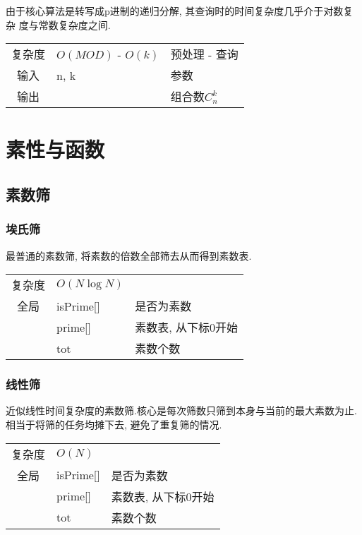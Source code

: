 由于核心算法是转写成p进制的递归分解, 其查询时的时间复杂度几乎介于对数复杂
度与常数复杂度之间.

\begin{longtable}{|c|l|l|}
复杂度 & $O(MOD)$ - $O(k)$ & 预处理 - 查询 \\
输入 & n, k & 参数 \\
输出 &  & 组合数$C^{k}_{n}$ \\
\end{longtable}






\section{素性与函数}


    \subsection{素数筛}\small


        \subsubsection{埃氏筛}\small
最普通的素数筛, 将素数的倍数全部筛去从而得到素数表.

\begin{longtable}{|c|l|l|}
复杂度 & $O(N \log N)$ &  \\
全局 & isPrime[] & 是否为素数 \\
 & prime[] & 素数表, 从下标0开始 \\
 & tot & 素数个数 \\
\end{longtable}



        \subsubsection{线性筛}\small
近似线性时间复杂度的素数筛.核心是每次筛数只筛到本身与当前的最大素数为止.
相当于将筛的任务均摊下去, 避免了重复筛的情况.

\begin{longtable}{|c|l|l|}
复杂度 & $O(N)$ &  \\
全局 & isPrime[] & 是否为素数 \\
 & prime[] & 素数表, 从下标0开始 \\
 & tot & 素数个数 \\
\end{longtable}



